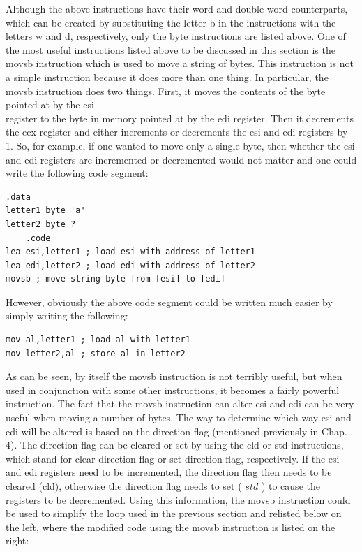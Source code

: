 \documentclass[10pt]{book}
\begin{document}
\begin{center}
\begin{center}
\begin{center}
Although the above instructions have their word and double word counterparts, which can be created by substituting the letter b in the instructions with the letters w and d, respectively, only the byte instructions are listed above. One of the most useful instructions listed above to be discussed in this section is the movsb instruction which is used to move a string of bytes. This instruction is not a simple instruction because it does more than one thing. In particular, the movsb instruction does two things. First, it moves the contents of the byte pointed at by the esi\\
register to the byte in memory pointed at by the edi register. Then it decrements the ecx register and either increments or decrements the esi and edi registers by 1. So, for example, if one wanted to move only a single byte, then whether the esi and edi registers are incremented or decremented would not matter and one could write the following code segment:


\begin{verbatim}
.data
letter1 byte 'a'
letter2 byte ?
    .code
lea esi,letter1 ; load esi with address of letter1
lea edi,letter2 ; load edi with address of letter2
movsb ; move string byte from [esi] to [edi]
\end{verbatim}

However, obviously the above code segment could be written much easier by simply writing the following:

\begin{verbatim}
mov al,letter1 ; load al with letter1
mov letter2,al ; store al in letter2
\end{verbatim}

As can be seen, by itself the movsb instruction is not terribly useful, but when used in conjunction with some other instructions, it becomes a fairly powerful instruction. The fact that the movsb instruction can alter esi and edi can be very useful when moving a number of bytes. The way to determine which way esi and edi will be altered is based on the direction flag (mentioned previously in Chap. 4). The direction flag can be cleared or set by using the cld or std instructions, which stand for clear direction flag or set direction flag, respectively. If the esi and edi registers need to be incremented, the direction flag then needs to be cleared (cld), otherwise the direction flag needs to set ( $s t d$ ) to cause the registers to be decremented. Using this information, the movsb instruction could be used to simplify the loop used in the previous section and relisted below on the left, where the modified code using the movsb instruction is listed on the right:


\end{center}
\end{center}
\end{center}
\end{document}

